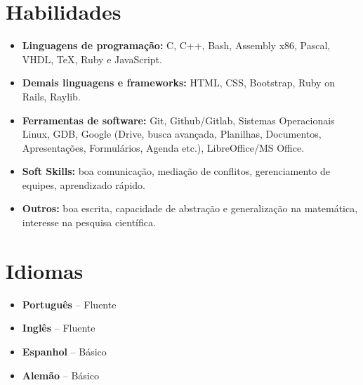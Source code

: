 \documentclass[a4paper, 12pt]{moderncv}
\begin{document}
\section{Habilidades}
\vspace{4pt}
\begin{itemize}
    \item{\textbf{Linguagens de programação:} C, C++, Bash, Assembly x86,
        Pascal, VHDL, \TeX, Ruby e JavaScript.}
    \vspace{4pt}
    \item{\textbf{Demais linguagens e frameworks:} HTML, CSS, Bootstrap, Ruby on Rails, Raylib.}
    \vspace{4pt}
    \item{\textbf{Ferramentas de software:} Git, Github/Gitlab, Sistemas
        Operacionais Linux, GDB, Google (Drive, busca avançada, Planilhas,
        Documentos, Apresentações, Formulários, Agenda etc.), LibreOffice/MS
        Office.}
    \vspace{4pt}
    \item{\textbf{Soft Skills:} boa comunicação, mediação de conflitos, gerenciamento
        de equipes, aprendizado rápido.}
    \vspace{4pt}
    \item{\textbf{Outros:} boa escrita, capacidade de abstração e generalização na
        matemática, interesse na pesquisa científica.}
\end{itemize}
\vspace{4pt}

\section{Idiomas}
\vspace{4pt}
\begin{itemize}
    \item{\textbf{Português} -- Fluente}
    \item{\textbf{Inglês} -- Fluente}
    \item{\textbf{Espanhol} -- Básico}
    \item{\textbf{Alemão} -- Básico}
\end{itemize}
\vspace{4pt}
\end{document}

